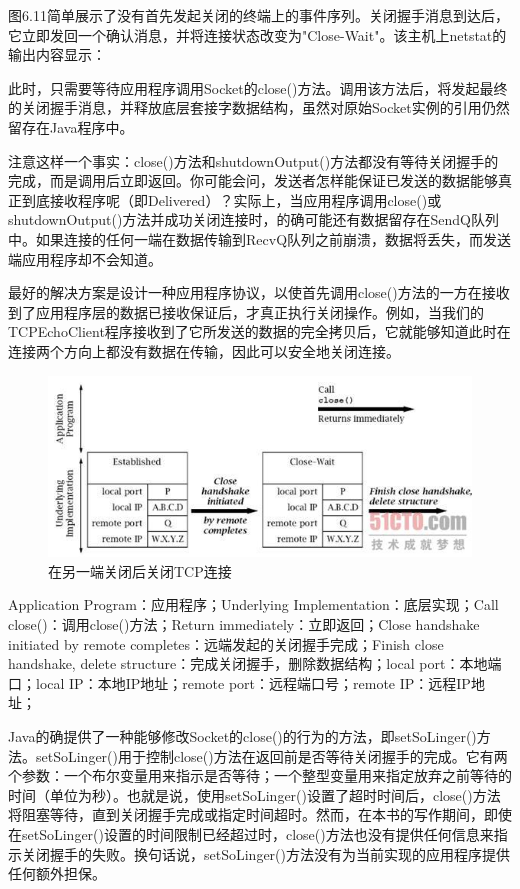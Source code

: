 		图6.11简单展示了没有首先发起关闭的终端上的事件序列。关闭握手消息到达后，它立即发回一个确认消息，并将连接状态改变为"Close-Wait"。该主机上netstat的输出内容显示：

		

		此时，只需要等待应用程序调用Socket的close()方法。调用该方法后，将发起最终的关闭握手消息，并释放底层套接字数据结构，虽然对原始Socket实例的引用仍然留存在Java程序中。

		注意这样一个事实：close()方法和shutdownOutput()方法都没有等待关闭握手的完成，而是调用后立即返回。你可能会问，发送者怎样能保证已发送的数据能够真正到底接收程序呢（即Delivered）？实际上，当应用程序调用close()或shutdownOutput()方法并成功关闭连接时，的确可能还有数据留存在SendQ队列中。如果连接的任何一端在数据传输到RecvQ队列之前崩溃，数据将丢失，而发送端应用程序却不会知道。

		最好的解决方案是设计一种应用程序协议，以使首先调用close()方法的一方在接收到了应用程序层的数据已接收保证后，才真正执行关闭操作。例如，当我们的TCPEchoClient程序接收到了它所发送的数据的完全拷贝后，它就能够知道此时在连接两个方向上都没有数据在传输，因此可以安全地关闭连接。

		\begin{figure}[htbp]%
			\centering
			\includegraphics[scale=.6]{img/06.11.jpg}
			\caption{在另一端关闭后关闭TCP连接}
			\label{fig:close.other.side.side.tcp}
		\end{figure}

		Application Program：应用程序；Underlying Implementation：底层实现；Call close()：调用close()方法；Return immediately：立即返回；Close handshake initiated by remote completes：远端发起的关闭握手完成；Finish close handshake, delete structure：完成关闭握手，删除数据结构；local port：本地端口；local IP：本地IP地址；remote port：远程端口号；remote IP：远程IP地址；

		Java的确提供了一种能够修改Socket的close()的行为的方法，即setSoLinger()方法。setSoLinger()用于控制close()方法在返回前是否等待关闭握手的完成。它有两个参数：一个布尔变量用来指示是否等待；一个整型变量用来指定放弃之前等待的时间（单位为秒）。也就是说，使用setSoLinger()设置了超时时间后，close()方法将阻塞等待，直到关闭握手完成或指定时间超时。然而，在本书的写作期间，即使在setSoLinger()设置的时间限制已经超过时，close()方法也没有提供任何信息来指示关闭握手的失败。换句话说，setSoLinger()方法没有为当前实现的应用程序提供任何额外担保。

